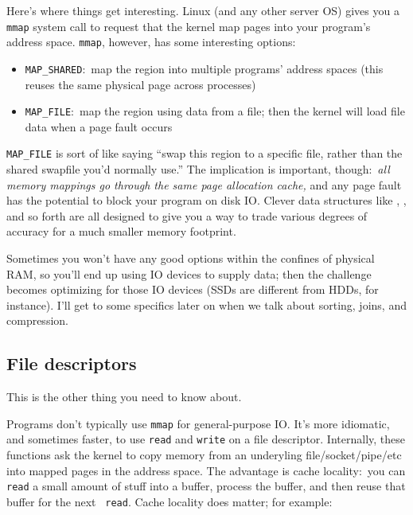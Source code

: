 Here's where things get interesting. Linux (and any other server OS) gives you
a {\tt mmap} system call to request that the kernel map pages into your
program's address space. {\tt mmap}, however, has some interesting options:

\begin{itemize}
  \item \verb|MAP_SHARED|:~map the region into multiple programs' address
        spaces (this reuses the same physical page across processes)
  \item \verb|MAP_FILE|:~map the region using data from a file; then the
        kernel will load file data when a page fault occurs
\end{itemize}

\verb|MAP_FILE| is sort of like saying ``swap this region to a specific file,
rather than the shared swapfile you'd normally use.'' The implication is
important, though:~{\it all memory mappings go through the same page
allocation cache,} and any page fault has the potential to block your program
on disk IO. Clever data structures like
,
, and so forth are all designed to give you a way to trade various
degrees of accuracy for a much smaller memory footprint.

Sometimes you won't have any good options within the confines of physical RAM,
so you'll end up using IO devices to supply data; then the challenge becomes
optimizing for those IO devices (SSDs are different from HDDs, for instance).
I'll get to some specifics later on when we talk about sorting, joins, and
compression.

\subsection{File descriptors}
This is the other thing you need to know about.

Programs don't typically use {\tt mmap} for general-purpose IO. It's more
idiomatic, and sometimes faster, to use {\tt read} and {\tt write} on a file
descriptor. Internally, these functions ask the kernel to copy memory from an
underyling file/socket/pipe/etc into mapped pages in the address space. The
advantage is cache locality:~you can {\tt read} a small amount of stuff into a
buffer, process the buffer, and then reuse that buffer for the next {\tt
read}. Cache locality does matter; for example:

